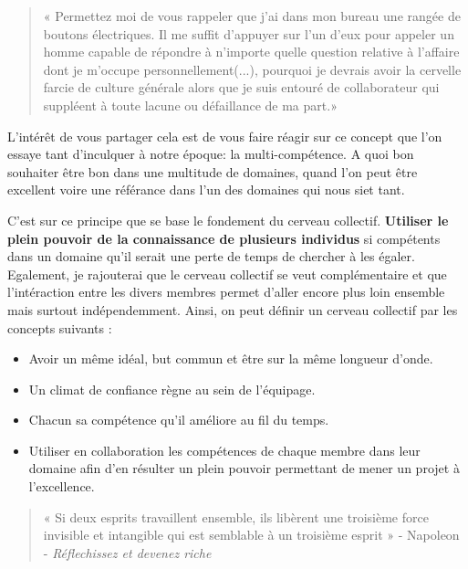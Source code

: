 					\begin{quote}
					« Permettez moi de vous rappeler que j'ai dans mon bureau une rangée de boutons électriques. Il me suffit d'appuyer sur l'un d'eux pour appeler un homme capable de répondre à n'importe quelle question relative à l'affaire dont je m'occupe personnellement(...), pourquoi je devrais avoir la cervelle farcie de culture générale alors que je suis entouré de collaborateur qui suppléent à toute lacune ou défaillance de ma part.»
					\end{quote}

			L'intérêt de vous partager cela est de vous faire réagir sur ce concept que l'on essaye tant d'inculquer à notre époque: la multi-compétence. A quoi bon souhaiter être bon dans une multitude de domaines, quand l'on peut être excellent voire une référance dans l'un des domaines qui nous siet tant.

			C'est sur ce principe que se base le fondement du cerveau collectif. \textbf{Utiliser le plein pouvoir de la connaissance de plusieurs individus} si compétents dans un domaine qu'il serait une perte de temps de chercher à les égaler.
			Egalement, je rajouterai que le cerveau collectif se veut complémentaire et que l'intéraction entre les divers membres permet d'aller encore plus loin ensemble mais surtout indépendemment.
			Ainsi, on peut définir un cerveau collectif par les concepts suivants : \\

			\begin{itemize}[label=\textbullet, font=\LARGE \color{burntorange}]
				\item Avoir un même idéal, but commun et être sur la même longueur d'onde.
				\item Un climat de confiance règne au sein de l'équipage.
				\item Chacun sa compétence qu'il améliore au fil du temps.
				\item Utiliser en collaboration les compétences de chaque membre dans leur domaine afin d'en résulter un plein pouvoir permettant de mener un projet à l'excellence.
			\end{itemize}

			\begin{quote}
			 « Si deux esprits travaillent ensemble, ils libèrent une troisième force invisible et intangible qui est semblable à un troisième esprit » - Napoleon  - \emph{Réflechissez et devenez riche}
			\end{quote}

